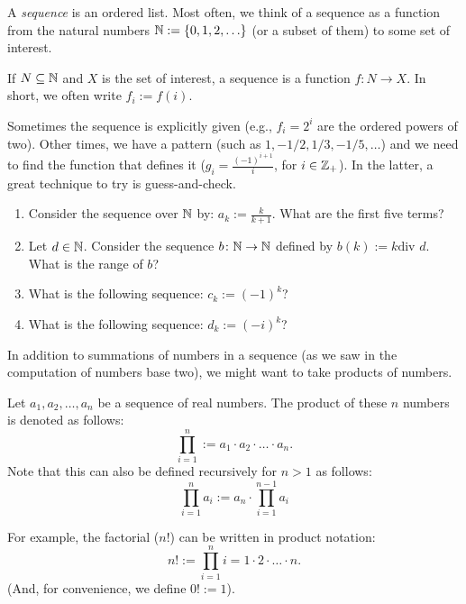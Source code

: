 \begin{definition}[Sequence]
    A \emph{sequence} is an ordered list.  Most often, we think of a sequence as
    a function from the natural numbers ${\mathbb N}:=\{ 0,1,2, \ldots\}$ (or a subset of
    them) to some set of interest.

    If $N \subseteq {\mathbb N}$ and $X$ is the set of interest, a sequence is a
    function $f \colon N \to X$.  In short, we often write $f_i:=f(i)$.
\end{definition}

Sometimes the sequence is explicitly given (e.g., $f_i=2^i$ are the ordered
powers of two).  Other times, we have a pattern (such as $1,-1/2, 1/3, -1/5,
\ldots$) and we need to find the function that defines it ($g_i=\frac{(-1)^{i+1}}{i}$, for
$i\in {\mathbb Z}_+$).  In the latter, a great technique to try is guess-and-check.

\pagebreak


\begin{enumerate}
    \item Consider the sequence over ${\mathbb N}$ by: $a_k :=\frac{k}{k+1}$.
        What are the first five terms?
        \practice
    \item Let $d \in {\mathbb N}$.  Consider the sequence $b \colon {\mathbb N} \to {\mathbb N}$ defined
        by $b(k):= k \text {div } d$.  What is the range of $b$?
        \practice
    \item What is the following sequence: $c_k := (-1)^{k}$?
        \practice
    \item What is the following sequence: $d_k := (-i)^{k}$?
        \practice
\end{enumerate}

In addition to summations of numbers in a sequence (as we saw in the computation
of numbers base two),
we might want to take products of numbers.

\begin{definition}
    Let $a_1, a_2, \ldots, a_n$ be a sequence of real numbers.
    The product of these $n$ numbers is denoted as follows:
    $$
        \prod_{i=1}^n:= a_1\cdot a_2 \cdot \ldots \cdot a_n.
    $$
    Note that this can also be defined recursively for $n > 1$ as follows:
    $$
        \prod_{i=1}^n a_i := a_n \cdot \prod_{i=1}^{n-1} a_i
    $$
\end{definition}

For example, the factorial ($n!$) can be written in product notation:
$$
    n! := \prod_{i=1}^n i = 1 \cdot 2 \cdot \ldots \cdot n.
$$
(And, for convenience, we define $0!:=1$).

